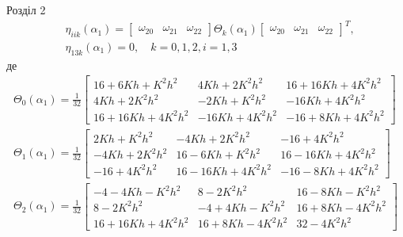 \documentclass[8pt]{beamer}
\numberwithin{figure}{section}
\numberwithin{equation}{section}
\begin{document}
\begin{frame}{Розділ 2}
\begin{equation}
\begin{aligned}
&\eta_{iik}\left(\alpha_1\right)=\left[\begin{array}{ccc}
\omega_{20} & \omega_{21} & \omega_{22}
\end{array} \right] \Theta_k\left(\alpha_1\right) \left[\begin{array}{ccc}
\omega_{20} & \omega_{21} & \omega_{22}
\end{array} \right]^T,\\
&\eta_{13k}\left(\alpha_1\right)=0, \quad k=0,1,2, i=1,3
\end{aligned}
\end{equation}
де
\begin{equation}\label{eq:sqt_strain_nl}
\begin{aligned}
\Theta_0\left(\alpha_1\right)=\frac{1}{32}
\left[
\begin{array}{ccc}
16+6Kh+K^2h^2 & 4Kh+2K^2h^2 & 16+16Kh+4K^2h^2 \\ 
4Kh+2K^2h^2 & -2Kh+K^2h^2 & -16Kh+4K^2h^2 \\ 
16+16Kh+4K^2h^2 & -16Kh+4K^2h^2 & -16+8Kh+4K^2h^2
\end{array}
\right]\\
\Theta_1\left(\alpha_1\right)=\frac{1}{32}
\left[
\begin{array}{ccc}
2Kh+K^2h^2 & -4Kh+2K^2h^2 & -16+4K^2h^2 \\ 
-4Kh+2K^2h^2 & 16-6Kh+K^2h^2 & 16-16Kh+4K^2h^2 \\ 
-16+4K^2h^2  & 16-16Kh+4K^2h^2 & -16-8Kh+4K^2h^2
\end{array}
\right]\\
\Theta_2\left(\alpha_1\right)=\frac{1}{32}
\left[
\begin{array}{ccc}
-4-4Kh-K^2h^2 & 8-2K^2h^2 & 16-8Kh-K^2h^2 \\ 
8-2K^2h^2 & -4+4Kh-K^2h^2 & 16+8Kh-4K^2h^2 \\ 
16+16Kh+4K^2h^2 & 16+8Kh-4K^2h^2 & 32-4K^2h^2
\end{array}
\right]\\
\end{aligned}
\end{equation}

\end{frame}
\end{document}
